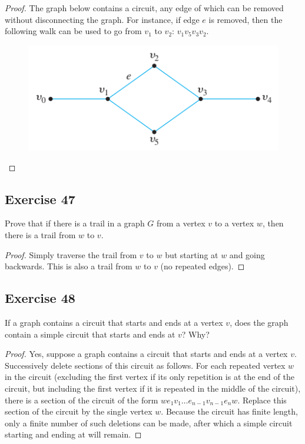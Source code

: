 \documentclass[14pt]{extarticle}
\begin{document}
\begin{proof}
The graph below contains a circuit, any edge of which can be removed without disconnecting the graph. For instance, if edge 
\(e\) is removed, then the following walk can be used to go from \(v_1\) to \(v_2\): \(v_1v_5v_3v_2\).

\begin{figure}[ht!]
\centering
\includegraphics[scale=0.5]{../images/10.1.46.png}
\end{figure}
\end{proof}

\subsection{Exercise 47}
Prove that if there is a trail in a graph \(G\) from a vertex \(v\) to a vertex \(w\), then there is a trail from \(w\) to \(v\).

\begin{proof}
Simply traverse the trail from \(v\) to \(w\) but starting at \(w\) and going backwards. This is also a trail from 
\(w\) to \(v\) (no repeated edges).
\end{proof}

\subsection{Exercise 48}
If a graph contains a circuit that starts and ends at a vertex \(v\), does the graph contain a simple circuit that starts and 
ends at \(v\)? Why?

\begin{proof}
Yes, suppose a graph contains a circuit that starts and ends at a vertex \(v\). Successively delete sections of this 
circuit as follows. For each repeated vertex \(w\) in the circuit (excluding the first vertex if its only repetition is 
at the end of the circuit, but including the first vertex if it is repeated in the middle of the circuit), there is a 
section of the circuit of the form \(we_1v_1 \ldots e_{n-1}v_{n-1}e_n w\). Replace this section of the circuit by the 
single vertex \(w\). Because the circuit has finite length, only a finite number of such deletions can be made, after 
which a simple circuit starting and ending at will remain.
\end{proof}
\end{document}
